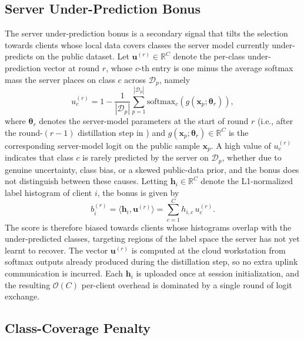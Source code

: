 \documentclass[journal]{IEEEtran}
\newcommand{\revIVE}[1]{#1}
\begin{document}
\subsection{Server Under-Prediction Bonus}
\label{ssec:bonus-term}

\revIVE{The server under-prediction bonus is a secondary signal that tilts the selection towards clients whose local data covers classes the server model currently under-predicts on the public dataset.} Let $\bm{u}^{(r)} \in \mathbb{R}^{C}$ denote the per-class under-prediction vector at round $r$, whose $c$-th entry is one minus the average softmax mass the server places on class $c$ across $\mathcal{D}_p$, namely
\begin{equation}
u_c^{(r)} = 1 - \frac{1}{|\mathcal{D}_p|}\sum_{p=1}^{|\mathcal{D}_p|} \mathrm{softmax}_c\!\left(g(\bm{x}_p; \bm{\theta}_r)\right),
\label{eq:uncert}
\end{equation}
where $\bm{\theta}_r$ denotes the server-model parameters at the start of round $r$ (i.e., after the round-$(r{-}1)$ distillation step in \cite[Algorithm~1]{mu2024fedtskd}) and $g(\bm{x}_p; \bm{\theta}_r) \in \mathbb{R}^{C}$ is the corresponding server-model logit on the public sample $\bm{x}_p$. \revIVE{A high value of $u_c^{(r)}$ indicates that class $c$ is rarely predicted by the server on $\mathcal{D}_p$, whether due to genuine uncertainty, class bias, or a skewed public-data prior, and the bonus does not distinguish between these causes.} Letting $\bm{h}_i \in \mathbb{R}^{C}$ denote the L1-normalized label histogram of client $i$, the bonus is given by
\begin{equation}
b_i^{(r)} = \langle \bm{h}_i, \bm{u}^{(r)} \rangle = \sum_{c=1}^{C} h_{i,c}\, u_c^{(r)}.
\label{eq:bonus}
\end{equation}
\revIVE{The score is therefore biased towards clients whose histograms overlap with the under-predicted classes, targeting regions of the label space the server has not yet learnt to recover. The vector $\bm{u}^{(r)}$ is computed at the cloud workstation from softmax outputs already produced during the distillation step, so no extra uplink communication is incurred. Each $\bm{h}_i$ is uploaded once at session initialization, and the resulting $\mathcal{O}(C)$ per-client overhead is dominated by a single round of logit exchange.}

\subsection{Class-Coverage Penalty}
\label{ssec:penalty-term}
\end{document}
